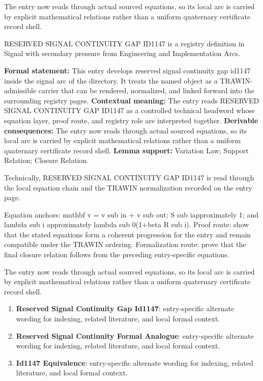 The entry now reads through actual sourced equations, so its local arc is carried by explicit mathematical relations rather than a uniform quaternary certificate record shell.
\clearpage


\begingroup\small
{}
RESERVED SIGNAL CONTINUITY GAP ID1147 is a registry definition in Signal with secondary pressure from Engineering and Implementation Arcs.

\begingroup\footnotesize\setlength{\emergencystretch}{3em}\sloppy
\textbf{Formal statement:} This entry develops reserved signal continuity gap id1147 inside the signal arc of the directory. It treats the named object as a TRAWIN-admissible carrier that can be rendered, normalized, and linked forward into the surrounding registry pages. \textbf{Contextual meaning:} The entry reads RESERVED SIGNAL CONTINUITY GAP ID1147 as a controlled technical headword whose equation layer, proof route, and registry role are interpreted together. \textbf{Derivable consequences:} The entry now reads through actual sourced equations, so its local arc is carried by explicit mathematical relations rather than a uniform quaternary certificate record shell. \textbf{Lemma support:} Variation Law; Support Relation; Closure Relation.\par
\endgroup

Technically, RESERVED SIGNAL CONTINUITY GAP ID1147 is read through the local equation chain and the TRAWIN normalization recorded on the entry page.

Equation anchors: mathbf v = v sub in + v sub out; S sub iapproximately 1; and lambda sub i approximately lambda sub 0(1+beta R sub i). Proof route: show that the stated equations form a coherent progression for the entry and remain compatible under the TRAWIN ordering. Formalization route: prove that the final closure relation follows from the preceding entry-specific equations.

The entry now reads through actual sourced equations, so its local arc is carried by explicit mathematical relations rather than a uniform quaternary certificate record shell.
\endgroup

\begin{enumerate}[leftmargin=1.6em,itemsep=6pt,topsep=4pt]
\item \textbf{Reserved Signal Continuity Gap Id1147}: entry-specific alternate wording for indexing, related literature, and local formal context.
\item \textbf{Reserved Signal Continuity Formal Analogue}: entry-specific alternate wording for indexing, related literature, and local formal context.
\item \textbf{Id1147 Equivalence}: entry-specific alternate wording for indexing, related literature, and local formal context.
\end{enumerate}


